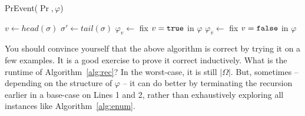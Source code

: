 \documentclass{tufte-handout}
\begin{document}
\begin{algorithm}
    \caption{PrEvent($\Pr, \varphi$)}
    $v \leftarrow head(\sigma)$\;
    $\sigma' \leftarrow tail(\sigma)$\;
    $ \varphi_v \leftarrow $ fix $v = \texttt{true}$ in $\varphi$\;
    $ \varphi_{\overline{v}} \leftarrow $ fix $v = \texttt{false}$ in $\varphi$\;
    \label{alg:rec}
\end{algorithm}

You should convince yourself that the above algorithm is correct by trying it on a few examples. 
It is a good exercise to prove it correct inductively.
What is the runtime of Algorithm~\ref{alg:rec}? In the worst-case, it is still $|\Omega|$. But, 
sometimes -- depending on the structure of $\varphi$ -- it can do better by terminating the 
recursion earlier in a base-case on Lines 1 and 2, rather than exhaustively exploring all 
instances like Algorithm~\ref{alg:enum}.




\end{document}
